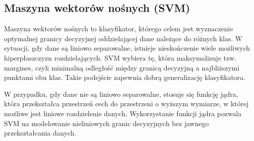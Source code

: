 \documentclass[a4paper,twoside,12pt]{book}
\begin{document}



\subsection*{Maszyna wektorów nośnych (SVM)}
Maszyna wektorów nośnych to klasyfikator, którego celem jest wyznaczenie optymalnej granicy decyzyjnej oddzielającej dane należące do różnych klas. W sytuacji, gdy dane są liniowo separowalne, istnieje nieskończenie wiele możliwych hiperpłaszczyzn rozdzielających. SVM wybiera tę, która maksymalizuje tzw. margines, czyli minimalną odległość między granicą decyzyjną a najbliższymi punktami obu klas. Takie podejście zapewnia dobrą generalizację klasyfikatora.

W przypadku, gdy dane nie są liniowo separowalne, stosuje się funkcję jądra, która przekształca przestrzeń cech do przestrzeni o wyższym wymiarze, w której możliwe jest liniowe rozdzielenie danych. Wykorzystanie funkcji jądra pozwala SVM na modelowanie nieliniowych granic decyzyjnych bez jawnego przekształcania danych.
\end{document}
